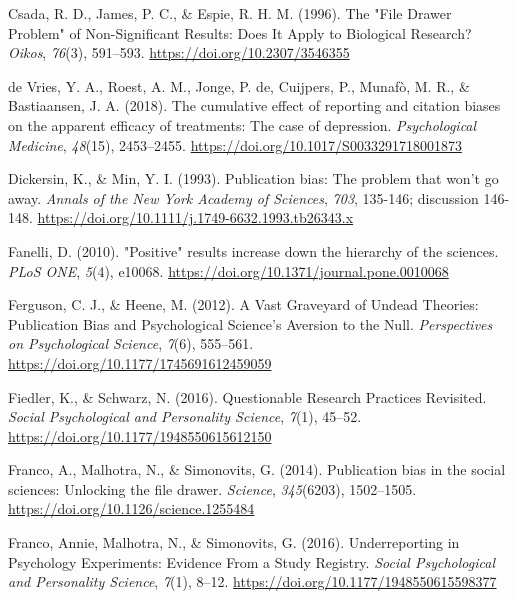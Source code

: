 \documentclass[
  ,man,mask,floatsintext]{apa6}
\newlength{\cslhangindent}
\newlength{\cslentryspacingunit} %
\newenvironment{CSLReferences}[2] %
 {%
  \setlength{\parindent}{0pt}
  \ifodd #1
  \let\oldpar\par
  \def\par{\hangindent=\cslhangindent\oldpar}
  \fi
  \setlength{\parskip}{#2\cslentryspacingunit}
 }%
 {}
\begin{document}
\begin{CSLReferences}{1}{0}
\leavevmode{}%
Csada, R. D., James, P. C., \& Espie, R. H. M. (1996). The "{File Drawer Problem}" of {Non-Significant Results}: {Does It Apply} to {Biological Research}? \emph{Oikos}, \emph{76}(3), 591--593. \url{https://doi.org/10.2307/3546355}

\leavevmode{}%
de Vries, Y. A., Roest, A. M., Jonge, P. de, Cuijpers, P., Munafò, M. R., \& Bastiaansen, J. A. (2018). The cumulative effect of reporting and citation biases on the apparent efficacy of treatments: The case of depression. \emph{Psychological Medicine}, \emph{48}(15), 2453--2455. \url{https://doi.org/10.1017/S0033291718001873}

\leavevmode{}%
Dickersin, K., \& Min, Y. I. (1993). Publication bias: The problem that won't go away. \emph{Annals of the New York Academy of Sciences}, \emph{703}, 135-146; discussion 146-148. \url{https://doi.org/10.1111/j.1749-6632.1993.tb26343.x}

\leavevmode{}%
Fanelli, D. (2010). "{Positive}" results increase down the hierarchy of the sciences. \emph{PLoS ONE}, \emph{5}(4), e10068. \url{https://doi.org/10.1371/journal.pone.0010068}

\leavevmode{}%
Ferguson, C. J., \& Heene, M. (2012). A {Vast Graveyard} of {Undead Theories}: {Publication Bias} and {Psychological Science}'s {Aversion} to the {Null}. \emph{Perspectives on Psychological Science}, \emph{7}(6), 555--561. \url{https://doi.org/10.1177/1745691612459059}

\leavevmode{}%
Fiedler, K., \& Schwarz, N. (2016). Questionable {Research Practices Revisited}. \emph{Social Psychological and Personality Science}, \emph{7}(1), 45--52. \url{https://doi.org/10.1177/1948550615612150}

\leavevmode{}%
Franco, A., Malhotra, N., \& Simonovits, G. (2014). Publication bias in the social sciences: {Unlocking} the file drawer. \emph{Science}, \emph{345}(6203), 1502--1505. \url{https://doi.org/10.1126/science.1255484}

\leavevmode{}%
Franco, Annie, Malhotra, N., \& Simonovits, G. (2016). Underreporting in {Psychology Experiments}: {Evidence From} a {Study Registry}. \emph{Social Psychological and Personality Science}, \emph{7}(1), 8--12. \url{https://doi.org/10.1177/1948550615598377}


\end{CSLReferences}
\end{document}
